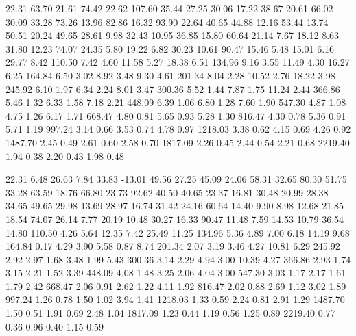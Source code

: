   22.31  63.70  21.61  74.42  22.62  107.60  35.44
  27.25  30.06  17.22  38.67  20.61  66.02  30.09
  33.28  73.26  13.96  82.86  16.32  93.90  22.64
  40.65  44.88  12.16  53.44  13.74  50.51  20.24
  49.65  28.61   9.98  32.43  10.95  36.85  15.80
  60.64  21.14   7.67  18.12   8.63  31.80  12.23
  74.07  24.35   5.80  19.22   6.82  30.23  10.61
  90.47  15.46   5.48  15.01   6.16  29.77   8.42
 110.50   7.42   4.60  11.58   5.27  18.38   6.51
 134.96   9.16   3.55  11.49   4.30  16.27   6.25
 164.84   6.50   3.02   8.92   3.48   9.30   4.61
 201.34   8.04   2.28  10.52   2.76  18.22   3.98
 245.92   6.10   1.97   6.34   2.24   8.01   3.47
 300.36   5.52   1.44   7.87   1.75  11.24   2.44
 366.86   5.46   1.32   6.33   1.58   7.18   2.21
 448.09   6.39   1.06   6.80   1.28   7.60   1.90
 547.30   4.87   1.08   4.75   1.26   6.17   1.71
 668.47   4.80   0.81   5.65   0.93   5.28   1.30
 816.47   4.30   0.78   5.36   0.91   5.71   1.19
 997.24   3.14   0.66   3.53   0.74   4.78   0.97
1218.03   3.38   0.62   4.15   0.69   4.26   0.92
1487.70   2.45   0.49   2.61   0.60   2.58   0.70
1817.09   2.26   0.45   2.44   0.54   2.21   0.68
2219.40   1.94   0.38   2.20   0.43   1.98   0.48


  22.31   6.48  26.63    7.84  33.83  -13.01  49.56
  27.25  45.09  24.06   58.31  32.65   80.30  51.75
  33.28  63.59  18.76   66.80  23.73   92.62  40.50
  40.65  23.37  16.81   30.48  20.99   28.38  34.65
  49.65  29.98  13.69   28.97  16.74   31.42  24.16
  60.64  14.40   9.90    8.98  12.68   21.85  18.54
  74.07  26.14   7.77   20.19  10.48   30.27  16.33
  90.47  11.48   7.59   14.53  10.79   36.54  14.80
 110.50   4.26   5.64   12.35   7.42   25.49  11.25
 134.96   5.36   4.89    7.00   6.18   14.19   9.68
 164.84   0.17   4.29    3.90   5.58    0.87   8.74
 201.34   2.07   3.19    3.46   4.27   10.81   6.29
 245.92   2.92   2.97    1.68   3.48    1.99   5.43
 300.36   3.14   2.29    4.94   3.00   10.39   4.27
 366.86   2.93   1.74    3.15   2.21    1.52   3.39
 448.09   4.08   1.48    3.25   2.06    4.04   3.00
 547.30   3.03   1.17    2.17   1.61    1.79   2.42
 668.47   2.06   0.91    2.62   1.22    4.11   1.92
 816.47   2.02   0.88    2.69   1.12    3.02   1.89
 997.24   1.26   0.78    1.50   1.02    3.94   1.41
1218.03   1.33   0.59    2.24   0.81    2.91   1.29
1487.70   1.50   0.51    1.91   0.69    2.48   1.04
1817.09   1.23   0.44    1.19   0.56    1.25   0.89
2219.40   0.77   0.36    0.96   0.40    1.15   0.59



